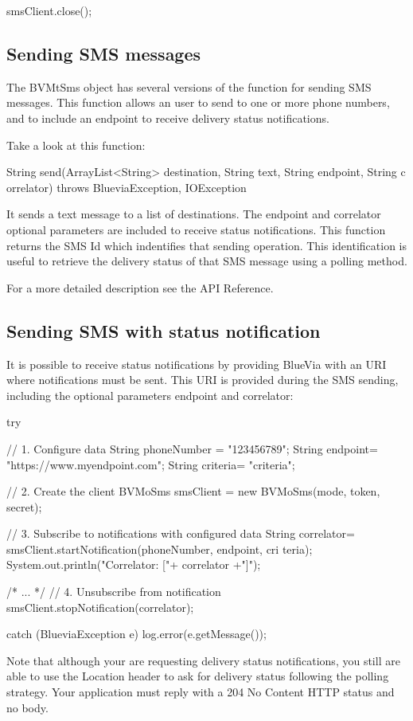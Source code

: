 \begin{DoxyCode}
smsClient.close();
\end{DoxyCode}
\hypertarget{blv_sms_mt_guide_sending_smsmessages_sec}{}\subsection{Sending SMS messages}\label{blv_sms_mt_guide_sending_smsmessages_sec}
The BVMtSms object has several versions of the function for sending SMS messages. This function allows an user to send to one or more phone numbers, and to include an endpoint to receive delivery status notifications.

Take a look at this function:


\begin{DoxyCode}
String send(ArrayList<String> destination, String text, String endpoint, String c
      orrelator) throws BlueviaException, IOException 
\end{DoxyCode}


It sends a text message to a list of destinations. The endpoint and correlator optional parameters are included to receive status notifications. This function returns the SMS Id which indentifies that sending operation. This identification is useful to retrieve the delivery status of that SMS message using a polling method.

For a more detailed description see the API Reference.\hypertarget{blv_sms_mt_guide_sms_sending_notification}{}\subsection{Sending SMS with status notification}\label{blv_sms_mt_guide_sms_sending_notification}
It is possible to receive status notifications by providing BlueVia with an URI where notifications must be sent. This URI is provided during the SMS sending, including the optional parameters endpoint and correlator: 
\begin{DoxyCode}
try {
        // 1. Configure data
        String phoneNumber = "123456789";
        String endpoint= "https://www.myendpoint.com";
        String criteria= "criteria";

        // 2. Create the client
        BVMoSms smsClient = new BVMoSms(mode, token, secret);
        
        // 3. Subscribe to notifications with configured data
        String correlator= smsClient.startNotification(phoneNumber, endpoint, cri
      teria);
        System.out.println("Correlator: ["+ correlator +"]");

        /* ... */
        // 4. Unsubscribe from notification
        smsClient.stopNotification(correlator);
                                          
} catch (BlueviaException e) {
        log.error(e.getMessage());
}
\end{DoxyCode}
 Note that although your are requesting delivery status notifications, you still are able to use the Location header to ask for delivery status following the polling strategy. Your application must reply with a 204 No Content HTTP status and no body.

